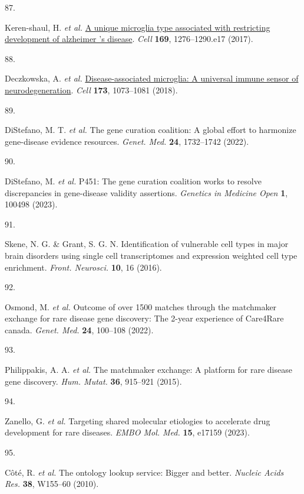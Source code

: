 \documentclass[
]{article}
\newlength{\cslhangindent}
\newlength{\csllabelwidth}
\newenvironment{CSLReferences}[2] %
 {\begin{list}{}{%
  \setlength{\itemindent}{0pt}
  \setlength{\leftmargin}{0pt}
  \setlength{\parsep}{0pt}
  \ifodd #1
   \setlength{\leftmargin}{\cslhangindent}
   \setlength{\itemindent}{-1\cslhangindent}
  \fi
  \setlength{\itemsep}{#2\baselineskip}}}
 {\end{list}}
\newcommand{\CSLLeftMargin}[1]{\parbox[t]{\csllabelwidth}{\strut#1\strut}}
\newcommand{\CSLRightInline}[1]{\parbox[t]{\linewidth - \csllabelwidth}{\strut#1\strut}}
\begin{document}
\begin{CSLReferences}{0}{0}
\CSLLeftMargin{87. }%
\CSLRightInline{Keren-shaul, H. \emph{et al.}
\href{https://doi.org/10.1016/j.cell.2017.05.018}{A unique microglia
type associated with restricting development of alzheimer 's disease}.
\emph{Cell} \textbf{169}, 1276--1290.e17 (2017).}

\CSLLeftMargin{88. }%
\CSLRightInline{Deczkowska, A. \emph{et al.}
\href{https://doi.org/10.1016/j.cell.2018.05.003}{Disease-associated
microglia: A universal immune sensor of neurodegeneration}. \emph{Cell}
\textbf{173}, 1073--1081 (2018).}

\CSLLeftMargin{89. }%
\CSLRightInline{DiStefano, M. T. \emph{et al.} The gene curation
coalition: A global effort to harmonize gene-disease evidence resources.
\emph{Genet. Med.} \textbf{24}, 1732--1742 (2022).}

\CSLLeftMargin{90. }%
\CSLRightInline{DiStefano, M. \emph{et al.} P451: The gene curation
coalition works to resolve discrepancies in gene-disease validity
assertions. \emph{Genetics in Medicine Open} \textbf{1}, 100498 (2023).}

\CSLLeftMargin{91. }%
\CSLRightInline{Skene, N. G. \& Grant, S. G. N. Identification of
vulnerable cell types in major brain disorders using single cell
transcriptomes and expression weighted cell type enrichment.
\emph{Front. Neurosci.} \textbf{10}, 16 (2016).}

\CSLLeftMargin{92. }%
\CSLRightInline{Osmond, M. \emph{et al.} Outcome of over 1500 matches
through the matchmaker exchange for rare disease gene discovery: The
2-year experience of {Care4Rare} canada. \emph{Genet. Med.} \textbf{24},
100--108 (2022).}

\CSLLeftMargin{93. }%
\CSLRightInline{Philippakis, A. A. \emph{et al.} The matchmaker
exchange: A platform for rare disease gene discovery. \emph{Hum. Mutat.}
\textbf{36}, 915--921 (2015).}

\CSLLeftMargin{94. }%
\CSLRightInline{Zanello, G. \emph{et al.} Targeting shared molecular
etiologies to accelerate drug development for rare diseases. \emph{EMBO
Mol. Med.} \textbf{15}, e17159 (2023).}

\CSLLeftMargin{95. }%
\CSLRightInline{Côté, R. \emph{et al.} The ontology lookup service:
Bigger and better. \emph{Nucleic Acids Res.} \textbf{38}, W155--60
(2010).}


\end{CSLReferences}
\end{document}
